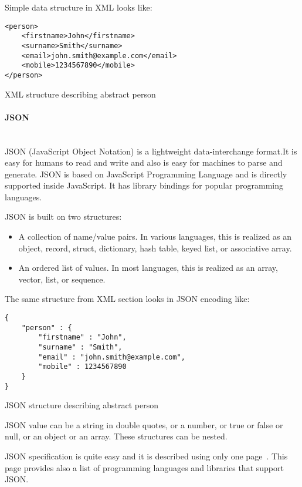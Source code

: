 Simple data structure in XML looks like:

\begin{listing}[H]
\begin{verbatim}
<person>
	<firstname>John</firstname>
	<surname>Smith</surname>
	<email>john.smith@example.com</email>
	<mobile>1234567890</mobile>
</person>
\end{verbatim}
\caption{XML structure describing abstract person}
\label{lst:xml_person_example}
\end{listing}


\paragraph{JSON} ~\\
\label{sec:json_description}
JSON (JavaScript Object Notation) is a lightweight data-interchange
format\cite{json_org}.It is easy for humans to read and write and also is
easy for machines to parse and generate. JSON is based on JavaScript
Programming Language and is directly supported inside JavaScript. It has library
bindings for popular programming languages.

JSON is built on two structures\cite{json_org}:
\begin{itemize}
  \item A collection of name/value pairs. In various languages, this is realized
  as an object, record, struct, dictionary, hash table, keyed list, or associative array.
  \item An ordered list of values. In most languages, this is realized as an
  array, vector, list, or sequence.
\end{itemize}

The same structure from XML section looks in JSON encoding like:
\begin{listing}[H]
\begin{verbatim}
{
	"person" : {
		"firstname" : "John",
		"surname" : "Smith",
		"email" : "john.smith@example.com",
		"mobile" : 1234567890
	}
}
\end{verbatim}
\caption{JSON structure describing abstract person}
\label{lst:json_person_example}
\end{listing}

JSON value can be a string in double quotes, or a number, or true or false or
null, or an object or an array. These structures can be nested.

JSON specification is quite easy and it is  described using only one
page~\cite{json_org}. This page provides also a list of programming languages
and libraries that support JSON. 

